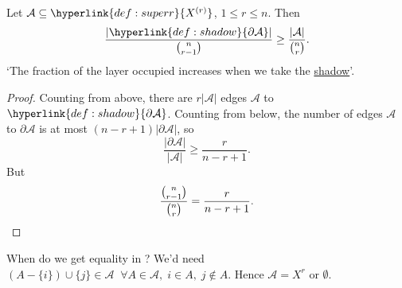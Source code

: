 \documentclass{article}
\begin{document}
\begin{nlemma}\label{thm:locallym}
  Let $\mathcal{A} \subseteq \hyperlink{def:superr}{X^{(r)}}$, $1 \leq r \leq n$. Then
  \begin{equation*}
    \frac{|\hyperlink{def:shadow}{\partial \mathcal{A}}|}{\binom{n}{r-1}} \geq \frac{|\mathcal{A}|}{\binom{n}{r}}.
  \end{equation*}
  `The fraction of the layer occupied increases when we take the \hyperlink{def:shadow}{shadow}'.
\end{nlemma}
\begin{proof}
  Counting from above, there are $r|\mathcal{A}|$ edges $\mathcal{A}$ to $\hyperlink{def:shadow}{\partial \mathcal{A}}$.
  Counting from below, the number of edges $\mathcal{A}$ to $\partial \mathcal{A}$ is at most $(n-r+1) |\partial \mathcal{A}|$, so
  \begin{equation*}
    \frac{|\partial \mathcal{A}|}{|\mathcal{A}|} \geq \frac{r}{n-r+1}.
  \end{equation*}
  But
  \begin{equation*}
    \frac{\binom{n}{r-1}}{\binom{n}{r}} = \frac{r}{n-r+1}.\qedhere
  \end{equation*}
\end{proof}

When do we get equality in ? We'd need $(A - \{i\}) \cup \{j\} \in \mathcal{A}\;\;\forall A \in \mathcal{A},\; i \in A,\; j \notin A$. Hence $\mathcal{A} = X^{r}$ or $\emptyset$.
\end{document}
